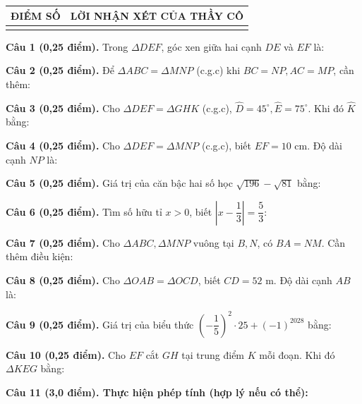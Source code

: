 \documentclass[12pt,a4paper]{article}
\begin{document}
\vspace{1.0mm}

\noindent
\begin{tabularx}{\linewidth}{|p{3.2cm}|X|}
\hline
\centering\textbf{ĐIỂM SỐ} & \centering\textbf{LỜI NHẬN XÉT CỦA THẦY CÔ} \tabularnewline
\hline
\rule{0pt}{1.8cm} & \tabularnewline
\hline
\end{tabularx}

\vspace{1.2mm}
\noindent\textbf{Câu 1 (0,25 điểm).} Trong $\Delta DEF$, góc xen giữa hai cạnh $DE$ và $EF$ là: \par\vspace{2.2mm}
\noindent\textbf{Câu 2 (0,25 điểm).} Để $\Delta ABC = \Delta MNP$ (c.g.c) khi $BC=NP, AC=MP$, cần thêm: \par\vspace{2.2mm}
\noindent\textbf{Câu 3 (0,25 điểm).} Cho $\Delta DEF = \Delta GHK$ (c.g.c), $\widehat{D}=45^\circ, \widehat{E}=75^\circ$. Khi đó $\widehat{K}$ bằng: \par\vspace{2.2mm}
\noindent\textbf{Câu 4 (0,25 điểm).} Cho $\Delta DEF = \Delta MNP$ (c.g.c), biết $EF = 10\text{ cm}$. Độ dài cạnh $NP$ là: \par\vspace{2.2mm}
\noindent\textbf{Câu 5 (0,25 điểm).} Giá trị của căn bậc hai số học $\sqrt{196} - \sqrt{81}$ bằng: \par\vspace{2.2mm}
\noindent\textbf{Câu 6 (0,25 điểm).} Tìm số hữu tỉ $x > 0$, biết $\left|x - \dfrac{1}{3}\right| = \dfrac{5}{3}$: \par\vspace{2.2mm}
\noindent\textbf{Câu 7 (0,25 điểm).} Cho $\Delta ABC, \Delta MNP$ vuông tại $B, N$, có $BA=NM$. Cần thêm điều kiện: \par\vspace{2.2mm}
\noindent\textbf{Câu 8 (0,25 điểm).} Cho $\Delta OAB = \Delta OCD$, biết $CD = 52\text{ m}$. Độ dài cạnh $AB$ là: \par\vspace{2.2mm}
\noindent\textbf{Câu 9 (0,25 điểm).} Giá trị của biểu thức $\left(-\dfrac{1}{5}\right)^2 \cdot 25 + (-1)^{2028}$ bằng: \par\vspace{2.2mm}
\noindent\textbf{Câu 10 (0,25 điểm).} Cho $EF$ cắt $GH$ tại trung điểm $K$ mỗi đoạn. Khi đó $\Delta KEG$ bằng: \par\vspace{2.2mm}
\vspace{0.2mm}
\noindent\textbf{Câu 11 (3,0 điểm). Thực hiện phép tính (hợp lý nếu có thể):}
\vspace{0.6mm}
\end{document}
